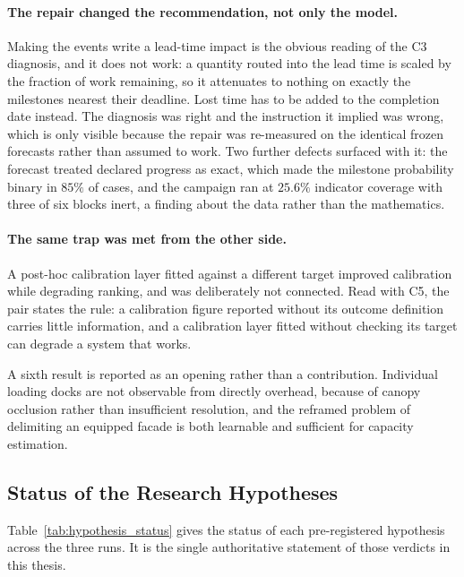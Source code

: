\paragraph{The repair changed the recommendation, not only the model.}
Making the events write a lead-time impact is the obvious reading of the C3 diagnosis, and it
does not work: a quantity routed into the lead time is scaled by the fraction of work
remaining, so it attenuates to nothing on exactly the milestones nearest their deadline. Lost
time has to be added to the completion date instead. The diagnosis was right and the
instruction it implied was wrong, which is only visible because the repair was re-measured on
the identical frozen forecasts rather than assumed to work. Two further defects surfaced with
it: the forecast treated declared progress as exact, which made the milestone probability
binary in $85\%$ of cases, and the campaign ran at $25.6\%$ indicator coverage with three of
six blocks inert, a finding about the data rather than the mathematics.

\paragraph{The same trap was met from the other side.}
A post-hoc calibration layer fitted against a different target improved calibration while
degrading ranking, and was deliberately not connected. Read with C5, the pair states the rule:
a calibration figure reported without its outcome definition carries little information, and a
calibration layer fitted without checking its target can degrade a system that works.

A sixth result is reported as an opening rather than a contribution. Individual loading docks
are not observable from directly overhead, because of canopy occlusion rather than
insufficient resolution, and the reframed problem of delimiting an equipped facade is both
learnable and sufficient for capacity estimation.

\subsection{Status of the Research Hypotheses}
\label{sec:hypothesis_status}

Table~\ref{tab:hypothesis_status} gives the status of each pre-registered hypothesis across
the three runs. It is the single authoritative statement of those verdicts in this thesis.

